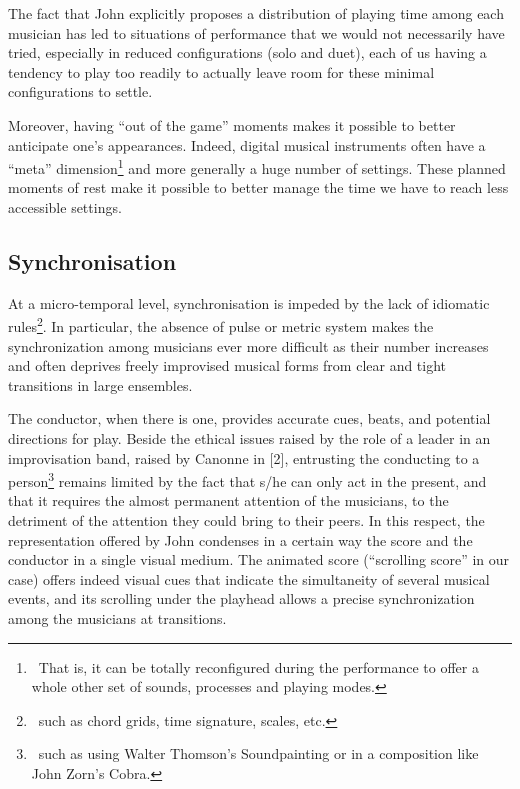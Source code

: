 The fact that John explicitly proposes a distribution of playing time among each musician has led to situations of performance that we would not necessarily have tried, especially in reduced configurations (solo and duet), each of us having a tendency to play too readily to actually leave room for these minimal configurations to settle.

Moreover, having “out of the game” moments makes it possible to better anticipate one's appearances. Indeed, digital musical instruments often have a “meta” dimension\footnote{ That is, it can be totally reconfigured during the performance to offer a whole other set of sounds, processes and playing modes.} and more generally a huge number of settings. These planned moments of rest make it possible to better manage the time we have to reach less accessible settings.

\subsection{Synchronisation}

At a micro-temporal level, synchronisation is impeded by the lack of idiomatic rules\footnote{ such as chord grids, time signature, scales, etc.}. In particular, the absence of pulse or metric system makes the synchronization among musicians ever more difficult as their number increases and often deprives freely improvised musical forms from clear and tight transitions in large ensembles.

The conductor, when there is one, provides accurate cues, beats, and potential directions for play. Beside the ethical issues raised by the role of a leader in an improvisation band, raised by Canonne in [2], entrusting the conducting to a person\footnote{ such as using Walter Thomson's Soundpainting or in a composition like John Zorn's Cobra.} remains limited by the fact that s/he can only act in the present, and that it requires the almost permanent attention of the musicians, to the detriment of the attention they could bring to their peers. In this respect, the representation offered by John condenses in a certain way the score and the conductor in a single visual medium. The animated score (“scrolling score” in our case) offers indeed visual cues that indicate the simultaneity of several musical events, and its scrolling under the playhead allows a precise synchronization among the musicians at transitions.


